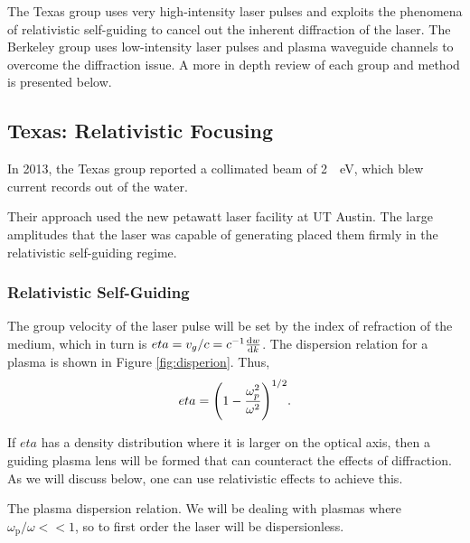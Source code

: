 \documentclass[12pt,letter]{article}
\renewcommand{\footnotesize}{\scriptsize}
\begin{document}
The Texas group uses very high-intensity laser pulses and exploits the
phenomena of relativistic self-guiding to cancel out the inherent diffraction
of the laser. The Berkeley group uses low-intensity laser pulses and plasma waveguide channels to overcome the diffraction issue. A more in depth review of
each group and method is presented below.

\subsection{Texas: Relativistic Focusing}

In 2013, the Texas group reported a collimated beam of \SI{2}{\giga
\electronvolt}, which blew current records out of the
water\cite{Wang2013}.

Their approach used the new petawatt laser facility at UT Austin. The large
amplitudes that the laser was capable of generating placed them firmly in the
relativistic self-guiding regime.

\subsubsection{Relativistic Self-Guiding}
The group velocity of the laser pulse will be set by the index of refraction of
the medium, which in turn is $eta = v_g/c = c^{-1}\dv{w}{k}$.  The dispersion
relation for a plasma is shown in Figure \ref{fig:disperion}. Thus,
\begin{equation}
    \label{eq:index}
    eta = \qty(1-\frac{\omega_p^2}{\omega^2})^{1/2}.
\end{equation}

If $eta$ has a density distribution where it is larger on the optical axis, then
a guiding plasma lens will be formed that can counteract the effects of
diffraction. As we will discuss below, one can use relativistic effects to
achieve this. 
\begin{marginfigure}
    \caption{\label{fig:dispersion}The plasma dispersion relation. We will be
        dealing with plasmas where $\omega_\mathrm{p}/\omega << 1$, so to
    first order the laser will be dispersionless. }
    \end{marginfigure}
\end{document}
